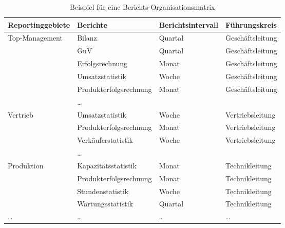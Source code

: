 \begin{table}[htbp]
  \centering
  \caption{Beispiel für eine Berichts-Organisationsmatrix}
  \label{tab:4-6}
  \small
  \begin{tabularx}{\textwidth}{@{}>{\raggedright\arraybackslash}p{2.5cm}>{\raggedright\arraybackslash}X>{\raggedright\arraybackslash}p{1.3cm}l@{}}
    \toprule
    Reporting\-gebiete & Berichte & Berichts\-intervall & Führungskreis \\
    \midrule
    Top-Management & Bilanz & Quartal & Geschäftsleitung \\
     & GuV & Quartal & Geschäftsleitung \\
     & Erfolgsrechnung & Monat & Geschäftsleitung \\
     & Umsatzstatistik & Woche & Geschäftsleitung \\
     & Produkterfolgsrechnung & Monat & Geschäftsleitung \\
     & \dots &  &  \\
    \addlinespace
    Vertrieb & Umsatzstatistik & Woche & Vertriebsleitung \\
     & Produkterfolgsrechnung & Monat & Vertriebsleitung \\
     & Verkäuferstatistik & Woche & Vertriebsleitung \\
     & \dots &  &  \\
    \addlinespace
    Produktion & Kapazitätsstatistik & Monat & Technikleitung \\
     & Produkterfolgsrechnung & Monat & Technikleitung \\
     & Stundenstatistik & Woche & Technikleitung \\
     & Wartungsstatistik & Quartal & Technikleitung \\
    \addlinespace
    \dots & \dots & \dots & \dots \\
    \bottomrule
  \end{tabularx}
\end{table}
